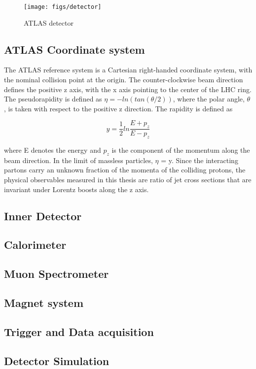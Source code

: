 \begin{figure}[H]
\begin{center}
\texttt{[image: figs/detector]}
\caption{
ATLAS detector 
}
\label{det}
\end{center}
\end{figure}


\subsection{ATLAS Coordinate system}
The ATLAS reference system is a Cartesian right-handed coordinate system, with the
nominal collision point at the origin. The counter-clockwise beam direction defines the
positive z axis, with the x axis pointing to the center of the LHC ring. The pseudorapidity
is defined as  $\eta = -ln(tan (\theta/2))$, where the polar angle, $ \theta $ , is taken with respect to the
positive z direction. The rapidity is defined as

\begin{equation} \label{eq:rapidity}
        y = \frac{1}{2} ln \frac{E+p_{z}}{E-p_{z}}
             \end{equation}

 where E denotes the energy and $p_{z}$ is the component of the momentum along the beam direction. In the limit of massless particles, $\eta$ = y. Since the interacting partons carry an unknown fraction of
the momenta of the colliding protons, the physical observables measured in this thesis are ratio of jet cross sections that are invariant under Lorentz boosts along the z axis.


\subsection{Inner Detector}


\subsection{Calorimeter}


\subsection{Muon Spectrometer}


\subsection{Magnet system}


\subsection{Trigger and Data acquisition}


\subsection{Detector Simulation}





